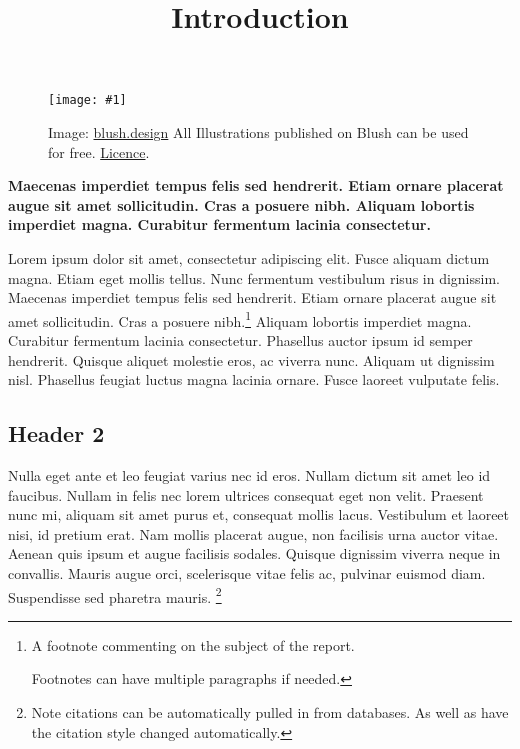 \documentclass{article}
\newlength{\imgwidth}
\newcommand\scaledgraphics[2]{%
                
\settowidth{\imgwidth}{\texttt{[image: \#1]}}%
                
\setlength{\imgwidth}{\minof{\imgwidth}{#2\textwidth}}%
                
\texttt{[image: \#1]}%
                
}
\begin{document}
\title{Introduction}

\maketitle

\begin{figure}
\scaledgraphics{61c76874-4adf-40b2-9803-0a3db690688c.png}{0.75}
\caption*{Image: \href{https://blush.design/}{blush.design} All Illustrations published on Blush can be used for free. \href{https://blush.design/license}{Licence}.}\label{F94100281}
\end{figure}


\textbf{Maecenas imperdiet tempus felis sed hendrerit. Etiam ornare placerat augue sit amet sollicitudin. Cras a posuere nibh. Aliquam lobortis imperdiet magna. Curabitur fermentum lacinia consectetur.}


Lorem ipsum dolor sit amet, consectetur adipiscing elit. Fusce aliquam dictum magna. Etiam eget mollis tellus. Nunc fermentum vestibulum risus in dignissim. Maecenas imperdiet tempus felis sed hendrerit. Etiam ornare placerat augue sit amet sollicitudin. Cras a posuere nibh.\footnote{A footnote commenting on the subject of the report.


Footnotes can have multiple paragraphs if needed.} Aliquam lobortis imperdiet magna. Curabitur fermentum lacinia consectetur. Phasellus auctor ipsum id semper hendrerit. Quisque aliquet molestie eros, ac viverra nunc. Aliquam ut dignissim nisl. Phasellus feugiat luctus magna lacinia ornare. Fusce laoreet vulputate felis.


\subsection{Header 2}\label{H152469}



Nulla eget ante et leo feugiat varius nec id eros. Nullam dictum sit amet leo id faucibus. Nullam in felis nec lorem ultrices consequat eget non velit. Praesent nunc mi, aliquam sit amet purus et, consequat mollis lacus. Vestibulum et laoreet nisi, id pretium erat. Nam mollis placerat augue, non facilisis urna auctor vitae. Aenean quis ipsum et augue facilisis sodales. Quisque dignissim viverra neque in convallis. Mauris augue orci, scelerisque vitae felis ac, pulvinar euismod diam. Suspendisse sed pharetra mauris. \autocite{KayAlan197208}\footnote{Note citations can be automatically pulled in from databases. As well as have the citation style changed automatically.}
\end{document}
